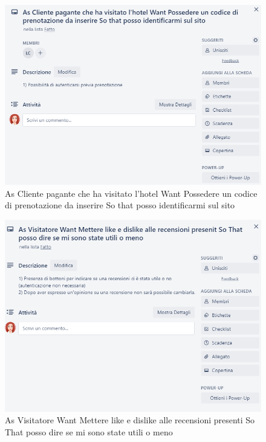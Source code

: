 \documentclass{article}[12pt]
\begin{document}
{{\begin{figure}
		\includegraphics[width=\columnwidth]{img/storia2.png}
		\caption{As Cliente pagante che ha visitato l'hotel Want Possedere un codice di prenotazione da inserire So that posso identificarmi sul sito}
	\end{figure}
	\begin{figure}
		\includegraphics[width=\columnwidth]{img/storia3.png}
		\caption{As Visitatore Want Mettere like e dislike alle recensioni presenti So That posso dire se mi sono state utili o meno}
	\end{figure}
	\begin{figure}

\end{figure}}}
\end{document}

